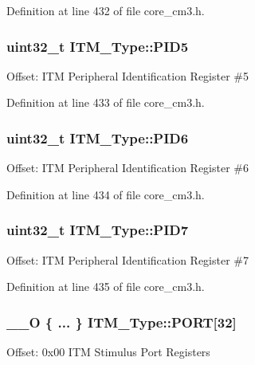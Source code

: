 Definition at line 432 of file core\+\_\+cm3.\+h.

\subsubsection[{\texorpdfstring{P\+I\+D5}{PID5}}]{ {\bf uint32\+\_\+t} I\+T\+M\+\_\+\+Type\+::\+P\+I\+D5}\hypertarget{struct_i_t_m___type_a9353055ceb7024e07d59248e54502cb9}{}\label{struct_i_t_m___type_a9353055ceb7024e07d59248e54502cb9}
Offset\+: I\+TM Peripheral Identification Register \#5 

Definition at line 433 of file core\+\_\+cm3.\+h.

\subsubsection[{\texorpdfstring{P\+I\+D6}{PID6}}]{ {\bf uint32\+\_\+t} I\+T\+M\+\_\+\+Type\+::\+P\+I\+D6}\hypertarget{struct_i_t_m___type_a755c0ec919e7dbb5f7ff05c8b56a3383}{}\label{struct_i_t_m___type_a755c0ec919e7dbb5f7ff05c8b56a3383}
Offset\+: I\+TM Peripheral Identification Register \#6 

Definition at line 434 of file core\+\_\+cm3.\+h.

\subsubsection[{\texorpdfstring{P\+I\+D7}{PID7}}]{ {\bf uint32\+\_\+t} I\+T\+M\+\_\+\+Type\+::\+P\+I\+D7}\hypertarget{struct_i_t_m___type_aa31ca6bb4b749201321b23d0dbbe0704}{}\label{struct_i_t_m___type_aa31ca6bb4b749201321b23d0dbbe0704}
Offset\+: I\+TM Peripheral Identification Register \#7 

Definition at line 435 of file core\+\_\+cm3.\+h.

\subsubsection[{\texorpdfstring{P\+O\+RT}{PORT}}]{\setlength{\rightskip}{0pt plus 5cm}\+\_\+\+\_\+O \{ ... \}    I\+T\+M\+\_\+\+Type\+::\+P\+O\+RT\mbox{[}32\mbox{]}}\hypertarget{struct_i_t_m___type_aabb85c8dcc25833f615a91c0f0682f59}{}\label{struct_i_t_m___type_aabb85c8dcc25833f615a91c0f0682f59}
Offset\+: 0x00 I\+TM Stimulus Port Registers 
